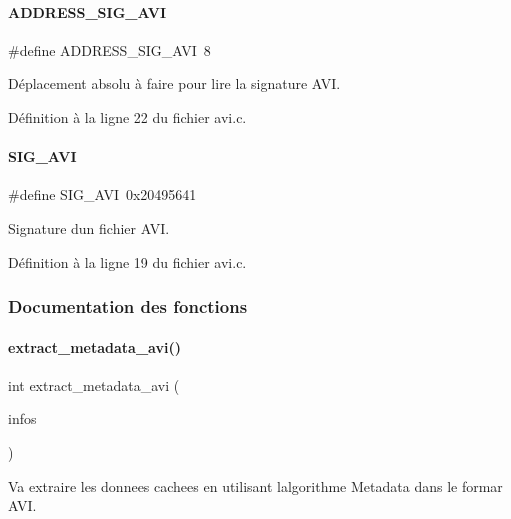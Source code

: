 \paragraph{\texorpdfstring{A\+D\+D\+R\+E\+S\+S\+\_\+\+S\+I\+G\+\_\+\+A\+VI}{ADDRESS\_SIG\_AVI}}
{\footnotesize\ttfamily \#define A\+D\+D\+R\+E\+S\+S\+\_\+\+S\+I\+G\+\_\+\+A\+VI~8}

Déplacement absolu à faire pour lire la signature A\+VI. 

Définition à la ligne 22 du fichier avi.\+c.

\mbox{\label{a00068_a71a158945b0ef5b392da52102a122aba}} 
\paragraph{\texorpdfstring{S\+I\+G\+\_\+\+A\+VI}{SIG\_AVI}}
{\footnotesize\ttfamily \#define S\+I\+G\+\_\+\+A\+VI~0x20495641}

Signature d\textquotesingle{}un fichier A\+VI. 

Définition à la ligne 19 du fichier avi.\+c.



\subsubsection{Documentation des fonctions}
\mbox{\label{a00068_aa0a2b469d42533228d073a79868e775b}} 
\paragraph{\texorpdfstring{extract\+\_\+metadata\+\_\+avi()}{extract\_metadata\_avi()}}
{\footnotesize\ttfamily int extract\+\_\+metadata\+\_\+avi (\begin{DoxyParamCaption}\item[{\hyperlink{a00008_aa8ca908d92fb5bdd3c0a9e1f58b2cf03}{info\+\_\+s} $\ast$}]{infos }\end{DoxyParamCaption})}



Va extraire les donnees cachees en utilisant l\textquotesingle{}algorithme Metadata dans le formar A\+VI. 


